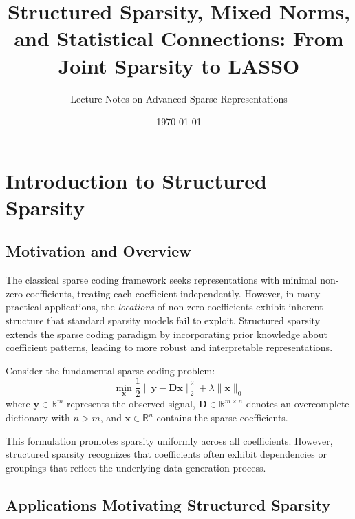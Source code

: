 \documentclass[12pt]{article}
\title{Structured Sparsity, Mixed Norms, and Statistical Connections: From Joint Sparsity to LASSO}
\author{Lecture Notes on Advanced Sparse Representations}
\date{\today}
\renewcommand{\vec}[1]{\mathbf{#1}}
\theoremstyle{definition}
\begin{document}
\maketitle

\tableofcontents
\newpage

\section{Introduction to Structured Sparsity}

\subsection{Motivation and Overview}

The classical sparse coding framework seeks representations with minimal non-zero coefficients, treating each coefficient independently. However, in many practical applications, the \textit{locations} of non-zero coefficients exhibit inherent structure that standard sparsity models fail to exploit. Structured sparsity extends the sparse coding paradigm by incorporating prior knowledge about coefficient patterns, leading to more robust and interpretable representations.

Consider the fundamental sparse coding problem:
\begin{equation}
    \min_{\vec{x}} \frac{1}{2}\|\vec{y} - \vec{D}\vec{x}\|_2^2 + \lambda\|\vec{x}\|_0
    \label{eq:basic_sparse}
\end{equation}
where $\vec{y} \in \mathbb{R}^m$ represents the observed signal, $\vec{D} \in \mathbb{R}^{m \times n}$ denotes an overcomplete dictionary with $n > m$, and $\vec{x} \in \mathbb{R}^n$ contains the sparse coefficients.

This formulation promotes sparsity uniformly across all coefficients. However, structured sparsity recognizes that coefficients often exhibit dependencies or groupings that reflect the underlying data generation process.

\subsection{Applications Motivating Structured Sparsity}
\end{document}
